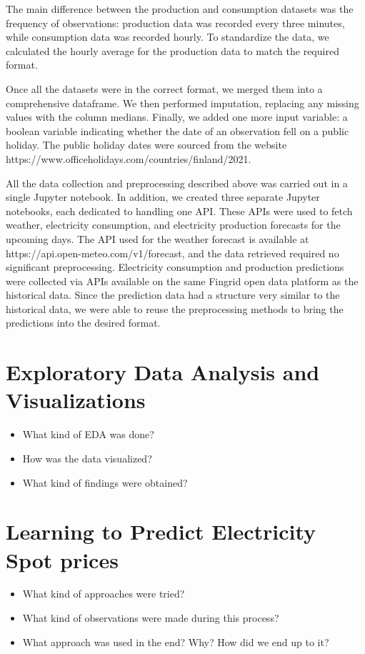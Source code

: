 \documentclass{article}
\numberwithin{equation}{section}
\begin{document}
\begin{itemize}
The main difference between the production and consumption datasets was the frequency of observations: production data was recorded every three minutes, while consumption data was recorded hourly. To standardize the data, we calculated the hourly average for the production data to match the required format.

Once all the datasets were in the correct format, we merged them into a comprehensive dataframe. We then performed imputation, replacing any missing values with the column medians. Finally, we added one more input variable: a boolean variable indicating whether the date of an observation fell on a public holiday. The public holiday dates were sourced from the website https://www.officeholidays.com/countries/finland/2021.

All the data collection and preprocessing described above was carried out in a single Jupyter notebook. In addition, we created three separate Jupyter notebooks, each dedicated to handling one API. These APIs were used to fetch weather, electricity consumption, and electricity production forecasts for the upcoming days. The API used for the weather forecast is available at https://api.open-meteo.com/v1/forecast, and the data retrieved required no significant preprocessing. Electricity consumption and production predictions were collected via APIs available on the same Fingrid open data platform as the historical data. Since the prediction data had a structure very similar to the historical data, we were able to reuse the preprocessing methods to bring the predictions into the desired format.
\end{itemize}

\section{Exploratory Data Analysis and Visualizations}
\begin{itemize}
	\item What kind of EDA was done?
	\item How was the data visualized?
	\item What kind of findings were obtained?
\end{itemize}

\section{Learning to Predict Electricity Spot prices}
\begin{itemize}
	\item What kind of approaches were tried?
	\item What kind of observations were made during this process?
	\item What approach was used in the end? Why? How did we end up to it?
\end{itemize}
\end{document}
